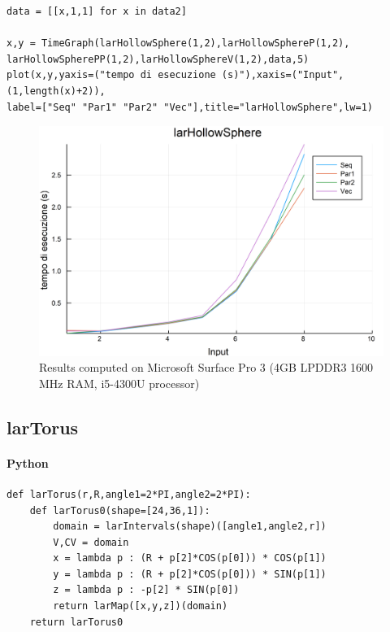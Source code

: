 \documentclass{article}
\begin{document}
\begin{Verbatim}
data = [[x,1,1] for x in data2]

x,y = TimeGraph(larHollowSphere(1,2),larHollowSphereP(1,2),
larHollowSpherePP(1,2),larHollowSphereV(1,2),data,5)
plot(x,y,yaxis=("tempo di esecuzione (s)"),xaxis=("Input",(1,length(x)+2)),
label=["Seq" "Par1" "Par2" "Vec"],title="larHollowSphere",lw=1)

\end{Verbatim}

\begin{figure}[htbp] 
\centering 
\includegraphics[scale=.13]{larHollowSphereTime.png} 
\caption{Results computed on Microsoft Surface Pro  3 (4GB LPDDR3 1600 MHz RAM, i5-4300U processor)} 
\end{figure}

\subsection{larTorus}

\paragraph{Python}

\begin{verbatim}
def larTorus(r,R,angle1=2*PI,angle2=2*PI):
    def larTorus0(shape=[24,36,1]):
        domain = larIntervals(shape)([angle1,angle2,r])
        V,CV = domain
        x = lambda p : (R + p[2]*COS(p[0])) * COS(p[1])
        y = lambda p : (R + p[2]*COS(p[0])) * SIN(p[1])
        z = lambda p : -p[2] * SIN(p[0])
        return larMap([x,y,z])(domain)
    return larTorus0
\end{verbatim}
\end{document}
